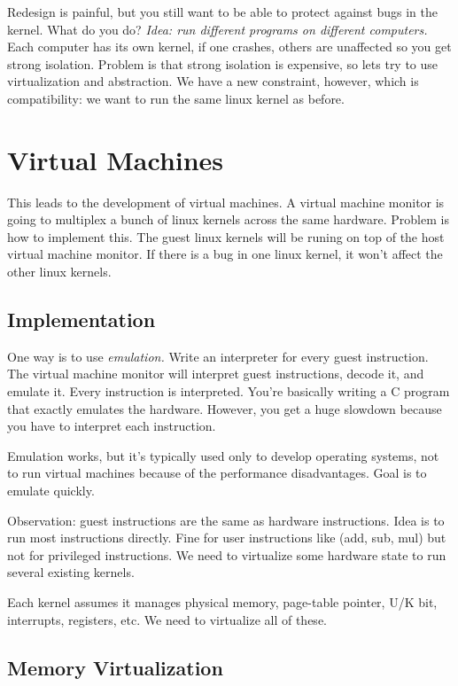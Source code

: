 \documentclass[psamsfonts]{amsart}
\begin{document}
Redesign is painful, but you still want to be able to protect against bugs in the kernel. What do you do? \emph{Idea: run different programs on different computers.} Each computer has its own kernel, if one crashes, others are unaffected so you get strong isolation. Problem is that strong isolation is expensive, so lets try to use virtualization and abstraction. We have a new constraint, however, which is compatibility: we want to run the same linux kernel as before.

\section{Virtual Machines}

This leads to the development of virtual machines. A virtual machine monitor is going to multiplex a bunch of linux kernels across the same hardware. Problem is how to implement this. The guest linux kernels will be runing on top of the host virtual machine monitor. If there is a bug in one linux kernel, it won't affect the other linux kernels.

\subsection{Implementation}

One way is to use \emph{emulation.} Write an interpreter for every guest instruction. The virtual machine monitor will interpret guest instructions, decode it, and emulate it. Every instruction is interpreted. You're basically writing a C program that exactly emulates the hardware. However, you get a huge slowdown because you have to interpret each instruction.

Emulation works, but it's typically used only to develop operating systems, not to run virtual machines because of the performance disadvantages. Goal is to emulate quickly.

Observation: guest instructions are the same as hardware instructions. Idea is to run most instructions directly. Fine for user instructions like (add, sub, mul) but not for privileged instructions. We need to virtualize some hardware state to run several existing kernels.

Each kernel assumes it manages physical memory, page-table pointer, U/K bit, interrupts, registers, etc. We need to virtualize all of these.

\subsection{Memory Virtualization}
\end{document}
